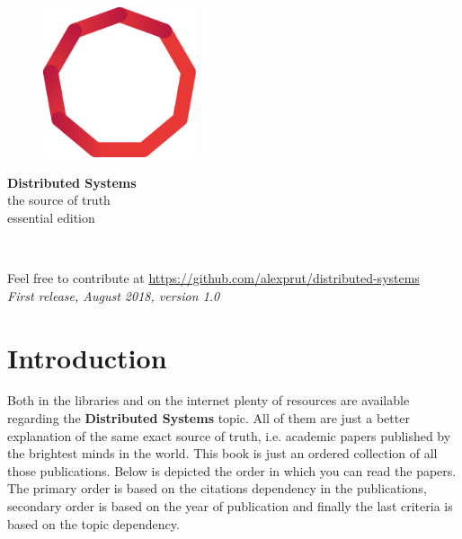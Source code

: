 \documentclass[11pt,fleqn]{book} %
\begin{document}

\begingroup
\thispagestyle{empty}
\pagecolor{cloud}\afterpage{\nopagecolor}
\centering
\vspace*{3cm}
\par\normalfont\fontsize{35}{35}\sffamily\selectfont
\begin{figure}[h]
    \centering
    \includegraphics[width=0.4\textwidth]{distributed-systems-red.pdf}
\end{figure}
\vspace*{1cm}
\textbf{Distributed Systems}\\
{\LARGE the source of truth} \\ {\small essential edition}\par
\vspace*{1cm}
\endgroup


\newpage
~\vfill
\thispagestyle{empty}

\noindent Feel free to contribute at \url{https://github.com/alexprut/distributed-systems}\\ %

\noindent \textit{First release, August 2018, version 1.0} %

 
\tableofcontents %


\chapter*{Introduction}
Both in the libraries and on the internet plenty of resources are available regarding the \textbf{Distributed Systems} topic. All of them are just a better explanation of the same exact source of truth, i.e. academic papers published by the brightest minds in the world. This book is just an ordered collection of all those publications. Below is depicted the order in which you can read the papers. The primary order is based on the citations dependency in the publications, secondary order is based on the year of publication and finally the last criteria is based on the topic dependency.
\end{document}
